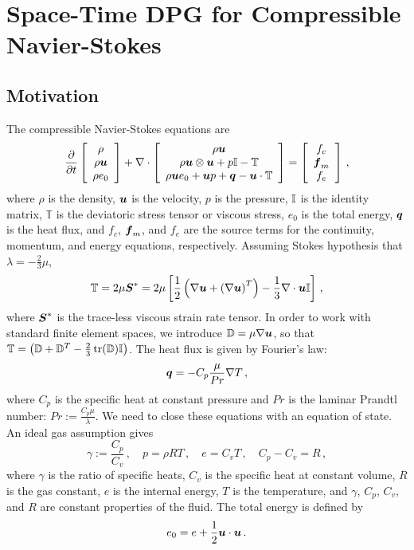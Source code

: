 \documentclass[Dissertation.tex]{subfiles}
\begin{document}
\chapter{Space-Time DPG for Compressible Navier-Stokes}
\section{Motivation}

The compressible Navier-Stokes equations are
\begin{align}
\frac{\partial}{\partial t}\left[ \begin{array}{c} \rho\\ \rho\boldsymbol u\\ \rho e_0\\ \end{array} \right]
+\nabla\cdot\left[ \begin{array}{c} \rho\boldsymbol u\\ \rho\boldsymbol u\otimes\boldsymbol u+p\mathbb{I}-\mathbb{T}\\ \rho\boldsymbol u e_0+\boldsymbol u p+\boldsymbol q-\boldsymbol u\cdot\mathbb{T}\\ \end{array} \right]
=\left[ \begin{array}{c} f_c\\ \boldsymbol f_m\\ f_e\\ \end{array} \right]\,,
\end{align}
where $\rho$ is the density, $\boldsymbol u$ is the velocity, $p$ is the pressure, $\mathbb{I}$ is the identity matrix,
$\mathbb{T}$ is the deviatoric stress tensor or viscous stress, $e_0$ is the total energy, $\boldsymbol q$ is the heat flux, 
and $f_c$, $\boldsymbol f_m$, and $f_e$ are the source terms for the continuity, momentum, and energy equations, respectively.
Assuming Stokes hypothesis that $\lambda=-\frac{2}{3}\mu$, 
\begin{equation*}
	\mathbb{T}=2\mu\boldsymbol S^*=2\mu\left[ \frac{1}{2}\left( \nabla\boldsymbol u+\left( \nabla\boldsymbol u \right)^T \right)-\frac{1}{3}\nabla\cdot\boldsymbol u\mathbb{I} \right]\,,
\end{equation*}
where $\boldsymbol S^*$ is the trace-less viscous strain rate tensor.
In order to work with standard finite element spaces, we introduce $\mathbb{D}=\mu\nabla\boldsymbol u$, so that 
$\mathbb{T}=\left( \mathbb{D}+\mathbb{D}^T-\frac{2}{3}\operatorname*{tr}(\mathbb{D})\mathbb{I} \right)$.
The heat flux is given by Fourier's law:
\begin{equation*}
	\boldsymbol q=-C_p\frac{\mu}{Pr}\nabla T\,,
\end{equation*}
where $C_p$ is the specific heat at constant pressure and $Pr$ is the laminar Prandtl number: $Pr:=\frac{C_p\mu}{\lambda}$.
We need to close these equations with an equation of state. An ideal gas assumption gives
\begin{equation*}
	\gamma:=\frac{C_p}{C_v}\,,\quad p=\rho RT\,,\quad e=C_v T\,,\quad C_p-C_v=R\,,
\end{equation*}
where $\gamma$ is the ratio of specific heats, $C_v$ is the specific heat at constant volume, $R$ is the gas constant,
$e$ is the internal energy, $T$ is the temperature,
and $\gamma$, $C_p$, $C_v$, and $R$ are constant properties of the fluid.
The total energy is defined by
\begin{equation*}
	e_0=e+\frac{1}{2}\boldsymbol u\cdot\boldsymbol u\,.
\end{equation*}
\end{document}
